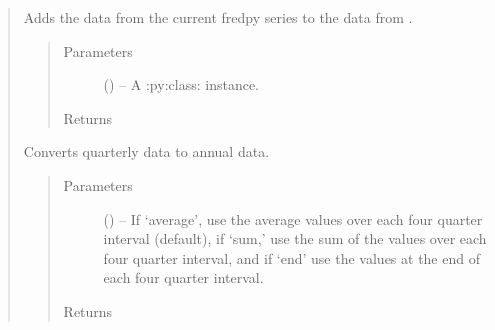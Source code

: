 \documentclass[letterpaper,10pt,openany,oneside,english]{sphinxmanual}
\begin{document}
\begin{fulllineitems}
\begin{quote}
\begin{fulllineitems}
\end{fulllineitems}


\begin{fulllineitems}
\label{\detokenize{series_class:fredpy.series.plus}}
Adds the data from the current fredpy series to the data from .
\begin{quote}\begin{description}
\item[{Parameters}] \leavevmode
{} ({\hyperref[\detokenize{series_class:fredpy.series}]{}}) -- A :py:class: instance.

\item[{Returns}] \leavevmode
{\hyperref[\detokenize{series_class:fredpy.series}]{}}

\end{description}\end{quote}

\end{fulllineitems}


\begin{fulllineitems}
\label{\detokenize{series_class:fredpy.series.quartertoannual}}
Converts quarterly data to annual data.
\begin{quote}\begin{description}
\item[{Parameters}] \leavevmode
{} (\href{https://docs.python.org/2/library/string.html\#module-string}{}) -- If `average', use the average values over each four quarter interval (default), if `sum,' use the sum of the values over each four quarter interval, and if `end' use the values at the end of each four quarter interval.

\item[{Returns}] \leavevmode
{\hyperref[\detokenize{series_class:fredpy.series}]{}}

\end{description}\end{quote}


\end{fulllineitems}
\end{quote}
\end{fulllineitems}
\end{document}
